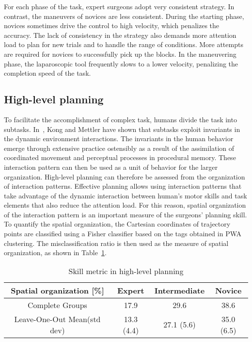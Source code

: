 \documentclass{llncs}
\begin{document}
For each phase of the task, expert surgeons adopt very consistent strategy. In contrast, the maneuvers of novices are less consistent. During the starting phase, novices sometimes drive the control to high velocity, which penalizes the accuracy. The lack of consistency in the strategy also demands more attention load to plan for new trials and to handle the range of conditions. More attempts are required for novices to successfully pick up the blocks. In the maneuvering phase, the laparoscopic tool frequently slows to a lower velocity, penalizing the completion speed of the task.

\subsection{High-level planning}

To facilitate the accomplishment of complex task, humans divide the task into subtasks. In~\cite{KongMettler13agentenvironmentinteractions}, Kong and Mettler have shown that subtasks exploit invariants in the dynamic environment interactions. The invariants in the human behavior emerge through extensive practice ostensibly as a result of the assimilation of coordinated movement and perceptual processes in procedural memory. These interaction pattern can then be used as a unit of behavior for the larger organization. High-level planning can therefore be assessed from the organization of interaction patterns. Effective planning allows using interaction patterns that take advantage of the dynamic interaction between human\rq{}s motor skills and task elements that also reduce the attention load. For this reason, spatial organization of the interaction pattern is an important measure of the surgeons' planning skill. To quantify the spatial organization, the Cartesian coordinates of trajectory points are classified using a Fisher classifier based on the tags obtained in PWA clustering.
The misclassification ratio is then used as the measure of spatial organization, as shown in Table~\ref{Tab:spatial_org}.

\begin{table}
  \centering
  \caption{Skill metric in high-level planning}\label{Tab:spatial_org}
  \begin{tabular}{c|ccc}
    \hline
Spatial organization [\%] & Expert & Intermediate & Novice \\ \hline
      Complete Groups & 17.9 & 29.6 & 38.6\\
      Leave-One-Out Mean(std dev) & 13.3  (4.4)  & 27.1 (5.6)  &  35.0 (6.5) \\
\end{tabular}
\end{table}
\end{document}
